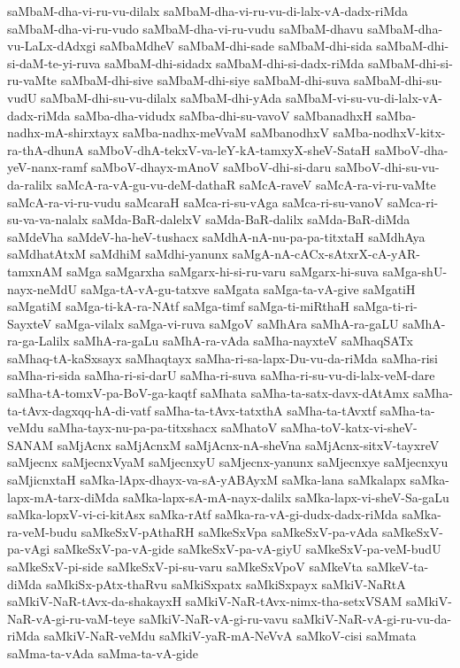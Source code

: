 {saMbaM-dha-vi-ru-vu-dilalx
saMbaM-dha-vi-ru-vu-di-lalx-vA-dadx-riMda
saMbaM-dha-vi-ru-vudo
saMbaM-dha-vi-ru-vudu
saMbaM-dhavu
saMbaM-dha-vu-LaLx-dAdxgi
saMbaMdheV
saMbaM-dhi-sade
saMbaM-dhi-sida
saMbaM-dhi-si-daM-te-yi-ruva
saMbaM-dhi-sidadx
saMbaM-dhi-si-dadx-riMda
saMbaM-dhi-si-ru-vaMte
saMbaM-dhi-sive
saMbaM-dhi-siye
saMbaM-dhi-suva
saMbaM-dhi-su-vudU
saMbaM-dhi-su-vu-dilalx
saMbaM-dhi-yAda
saMbaM-vi-su-vu-di-lalx-vA-dadx-riMda
saMba-dha-vidudx
saMba-dhi-su-vavoV
saMbanadhxH
saMba-nadhx-mA-shirxtayx
saMba-nadhx-meVvaM
saMbanodhxV
saMba-nodhxV-kitx-ra-thA-dhunA
saMboV-dhA-tekxV-va-leY-kA-tamxyX-sheV-SataH
saMboV-dha-yeV-nanx-ramf
saMboV-dhayx-mAnoV
saMboV-dhi-si-daru
saMboV-dhi-su-vu-da-ralilx
saMcA-ra-vA-gu-vu-deM-dathaR
saMcA-raveV
saMcA-ra-vi-ru-vaMte
saMcA-ra-vi-ru-vudu
saMcaraH
saMca-ri-su-vAga
saMca-ri-su-vanoV
saMca-ri-su-va-va-nalalx
saMda-BaR-dalelxV
saMda-BaR-dalilx
saMda-BaR-diMda
saMdeVha
saMdeV-ha-heV-tushacx
saMdhA-nA-nu-pa-pa-titxtaH
saMdhAya
saMdhatAtxM
saMdhiM
saMdhi-yanunx
saMgA-nA-cACx-sAtxrX-cA-yAR-tamxnAM
saMga
saMgarxha
saMgarx-hi-si-ru-varu
saMgarx-hi-suva
saMga-shU-nayx-neMdU
saMga-tA-vA-gu-tatxve
saMgata
saMga-ta-vA-give
saMgatiH
saMgatiM
saMga-ti-kA-ra-NAtf
saMga-timf
saMga-ti-miRthaH
saMga-ti-ri-SayxteV
saMga-vilalx
saMga-vi-ruva
saMgoV
saMhAra
saMhA-ra-gaLU
saMhA-ra-ga-Lalilx
saMhA-ra-gaLu
saMhA-ra-vAda
saMha-nayxteV
saMhaqSATx
saMhaq-tA-kaSxsayx
saMhaqtayx
saMha-ri-sa-lapx-Du-vu-da-riMda
saMha-risi
saMha-ri-sida
saMha-ri-si-darU
saMha-ri-suva
saMha-ri-su-vu-di-lalx-veM-dare
saMha-tA-tomxV-pa-BoV-ga-kaqtf
saMhata
saMha-ta-satx-davx-dAtAmx
saMha-ta-tAvx-dagxqq-hA-di-vatf
saMha-ta-tAvx-tatxthA
saMha-ta-tAvxtf
saMha-ta-veMdu
saMha-tayx-nu-pa-pa-titxshacx
saMhatoV
saMha-toV-katx-vi-sheV-SANAM
saMjAcnx
saMjAcnxM
saMjAcnx-nA-sheVna
saMjAcnx-sitxV-tayxreV
saMjecnx
saMjecnxVyaM
saMjecnxyU
saMjecnx-yanunx
saMjecnxye
saMjecnxyu
saMjicnxtaH
saMka-lApx-dhayx-va-sA-yABAyxM
saMka-lana
saMkalapx
saMka-lapx-mA-tarx-diMda
saMka-lapx-sA-mA-nayx-dalilx
saMka-lapx-vi-sheV-Sa-gaLu
saMka-lopxV-vi-ci-kitAsx
saMka-rAtf
saMka-ra-vA-gi-dudx-dadx-riMda
saMka-ra-veM-budu
saMkeSxV-pAthaRH
saMkeSxVpa
saMkeSxV-pa-vAda
saMkeSxV-pa-vAgi
saMkeSxV-pa-vA-gide
saMkeSxV-pa-vA-giyU
saMkeSxV-pa-veM-budU
saMkeSxV-pi-side
saMkeSxV-pi-su-varu
saMkeSxVpoV
saMkeVta
saMkeV-ta-diMda
saMkiSx-pAtx-thaRvu
saMkiSxpatx
saMkiSxpayx
saMkiV-NaRtA
saMkiV-NaR-tAvx-da-shakayxH
saMkiV-NaR-tAvx-nimx-tha-setxVSAM
saMkiV-NaR-vA-gi-ru-vaM-teye
saMkiV-NaR-vA-gi-ru-vavu
saMkiV-NaR-vA-gi-ru-vu-da-riMda
saMkiV-NaR-veMdu
saMkiV-yaR-mA-NeVvA
saMkoV-cisi
saMmata
saMma-ta-vAda
saMma-ta-vA-gide
}
